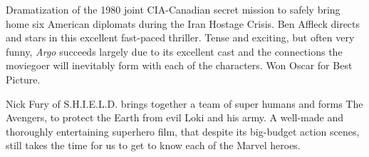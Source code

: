 \iffalse
\movie{Annie Hall}{1977}{93m}{\four} \dir{Woody Allen} \cast{Woody Allen; Diane Keaton; Tony Roberts}
\fi

   Dramatization of the 1980 joint CIA-Canadian secret mission to safely bring home six American diplomats during the Iran Hostage Crisis. Ben Affleck directs and stars in this excellent fast-paced thriller. Tense and exciting, but often very funny, \textit{Argo} succeeds largely due to its excellent cast and the connections the moviegoer will inevitably form with each of the characters. Won Oscar for Best Picture. \author{DW} 

   Nick Fury of S.H.I.E.L.D. brings together a team of super humans and forms The Avengers, to protect the Earth from evil Loki and his army. A well-made and thoroughly entertaining superhero film, that despite its big-budget action scenes, still takes the time for us to get to know each of the Marvel heroes. \author{DW} 

